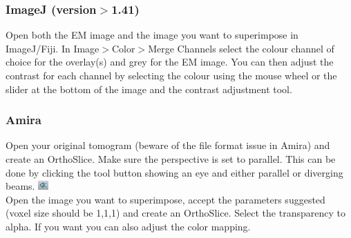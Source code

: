 \documentclass[10pt,a4paper,onepage,DIV12]{scrartcl}
\begin{document}
\subsubsection*{ImageJ (version$>$1.41)}
Open both the EM image and the image you want to superimpose in ImageJ/Fiji. In Image$>$Color$>$Merge Channels select the colour channel of choice for the overlay(s) and grey for the EM image. You can then adjust the contrast for each channel by selecting the colour using the mouse wheel or the slider at the bottom of the image and the contrast adjustment tool.

\subsubsection*{Amira}
Open your original tomogram (beware of the file format issue in Amira) and create an OrthoSlice. Make sure the perspective is set to parallel. This can be done by clicking the tool button showing an eye and either parallel or diverging beams. \includegraphics[width=0.03\textwidth]{images/perspective.png}\\Open the image you want to superimpose, accept the parameters suggested (voxel size should be 1,1,1) and create an OrthoSlice. Select the transparency to alpha. If you want you can also adjust the color mapping. 
\end{document}
